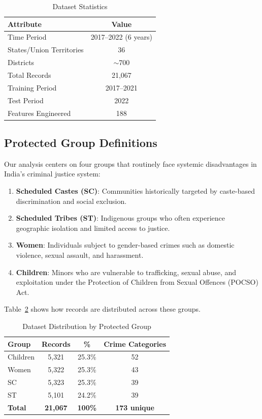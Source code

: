 \documentclass[conference]{IEEEtran}
\begin{document}
\begin{table}[!t]
\caption{Dataset Statistics}
\label{tab:dataset_stats}
\centering
\begin{tabular}{lc}
\toprule
\textbf{Attribute} & \textbf{Value} \\
\midrule
Time Period & 2017--2022 (6 years) \\
States/Union Territories & 36 \\
Districts & $\sim$700 \\
Total Records & 21,067 \\
Training Period & 2017--2021 \\
Test Period & 2022 \\
Features Engineered & 188 \\
\bottomrule
\end{tabular}
\end{table}

\subsection{Protected Group Definitions}

Our analysis centers on four groups that routinely face systemic disadvantages in India's criminal justice system:

\begin{enumerate}
    \item \textbf{Scheduled Castes (SC)}: Communities historically targeted by caste-based discrimination and social exclusion.
    \item \textbf{Scheduled Tribes (ST)}: Indigenous groups who often experience geographic isolation and limited access to justice.
    \item \textbf{Women}: Individuals subject to gender-based crimes such as domestic violence, sexual assault, and harassment.
    \item \textbf{Children}: Minors who are vulnerable to trafficking, sexual abuse, and exploitation under the Protection of Children from Sexual Offences (POCSO) Act.
\end{enumerate}

Table~\ref{tab:group_distribution} shows how records are distributed across these groups.

\begin{table}[!t]
\caption{Dataset Distribution by Protected Group}
\label{tab:group_distribution}
\centering
\begin{tabular}{lccc}
\toprule
\textbf{Group} & \textbf{Records} & \textbf{\%} & \textbf{Crime Categories} \\
\midrule
Children & 5,321 & 25.3\% & 52 \\
Women & 5,322 & 25.3\% & 43 \\
SC & 5,323 & 25.3\% & 39 \\
ST & 5,101 & 24.2\% & 39 \\
\midrule
\textbf{Total} & \textbf{21,067} & \textbf{100\%} & \textbf{173 unique} \\
\bottomrule
\end{tabular}
\end{table}
\end{document}
